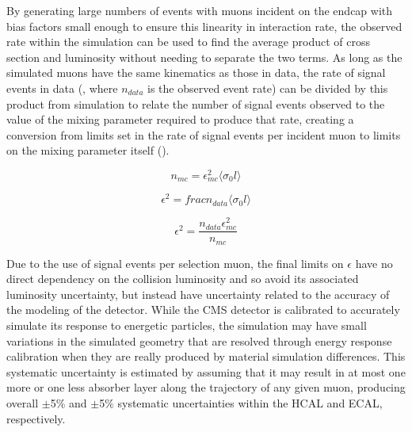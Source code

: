 By generating large numbers of events with muons incident on the endcap with bias factors small enough to ensure this linearity in interaction rate, the observed rate within the simulation can be used to find the average product of cross section and luminosity without needing to separate the two terms.
As long as the simulated muons have the same kinematics as those in data, the rate of signal events in data (, where $n_{data}$ is the observed event rate) can be divided by this product from simulation to relate the number of signal events observed to the value of the mixing parameter required to produce that rate, creating a conversion from limits set in the rate of signal events per incident muon to limits on the mixing parameter itself ().

\begin{equation}
	\label{eq:mcrate}
	n_{mc} = \epsilon_{mc}^2 \langle \sigma_0 l \rangle
\end{equation}

\begin{equation}
	\label{eq:datarate}
	\epsilon^2 = frac{n_{data}}{\langle \sigma_0 l\rangle}
\end{equation}

\begin{equation}
	\label{eq:fixedLumi}
	\epsilon^2 = \frac{n_{data}\epsilon_{mc}^2}{n_{mc}}  
\end{equation}

Due to the use of signal events per selection muon, the final limits on $\epsilon$ have no direct dependency on the collision luminosity and so avoid its associated luminosity uncertainty, but instead have uncertainty related to the accuracy of the modeling of the detector.
While the CMS detector is calibrated to accurately simulate its response to energetic particles, the simulation may have small variations in the simulated geometry that are resolved through energy response calibration when they are really produced by material simulation differences.
This systematic uncertainty is estimated by assuming that it may result in at most one more or one less absorber layer along the trajectory of any given muon, producing overall $\pm$5$\%$ and $\pm$5$\%$ systematic uncertainties within the HCAL and ECAL, respectively.